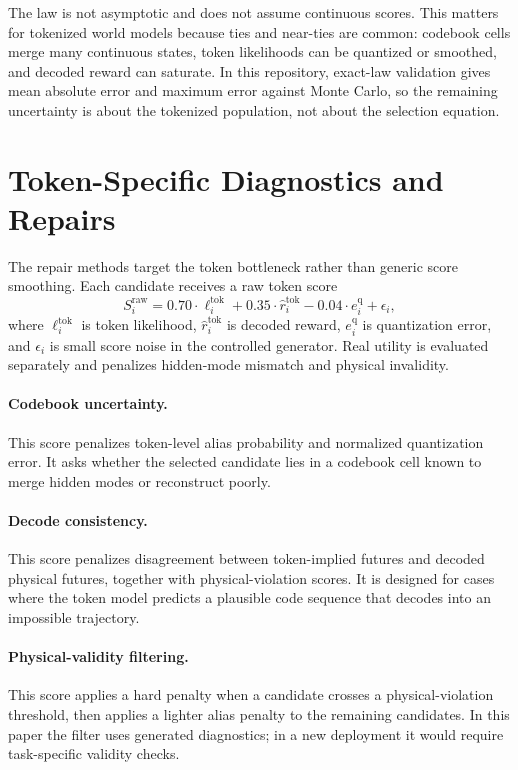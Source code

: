 \documentclass{article}
\newcommand{\tok}{\mathrm{tok}}
\begin{document}
The law is not asymptotic and does not assume continuous scores. This matters for tokenized world models because ties and near-ties are common: codebook cells merge many continuous states, token likelihoods can be quantized or smoothed, and decoded reward can saturate. In this repository, exact-law validation gives mean absolute error \VThreeLawMae{} and maximum error \VThreeLawMaxError{} against Monte Carlo, so the remaining uncertainty is about the tokenized population, not about the selection equation.

\section{Token-Specific Diagnostics and Repairs}
\label{sec:method}

The repair methods target the token bottleneck rather than generic score smoothing. Each candidate receives a raw token score
\[
S_i^{\mathrm{raw}} = 0.70 \cdot \ell_i^{\tok}
 + 0.35 \cdot \hat r_i^{\tok}
 - 0.04 \cdot e_i^{\mathrm{q}}
 + \epsilon_i,
\]
where $\ell_i^{\tok}$ is token likelihood, $\hat r_i^{\tok}$ is decoded reward, $e_i^{\mathrm{q}}$ is quantization error, and $\epsilon_i$ is small score noise in the controlled generator. Real utility is evaluated separately and penalizes hidden-mode mismatch and physical invalidity.

\paragraph{Codebook uncertainty.}
This score penalizes token-level alias probability and normalized quantization error. It asks whether the selected candidate lies in a codebook cell known to merge hidden modes or reconstruct poorly.

\paragraph{Decode consistency.}
This score penalizes disagreement between token-implied futures and decoded physical futures, together with physical-violation scores. It is designed for cases where the token model predicts a plausible code sequence that decodes into an impossible trajectory.

\paragraph{Physical-validity filtering.}
This score applies a hard penalty when a candidate crosses a physical-violation threshold, then applies a lighter alias penalty to the remaining candidates. In this paper the filter uses generated diagnostics; in a new deployment it would require task-specific validity checks.
\end{document}
